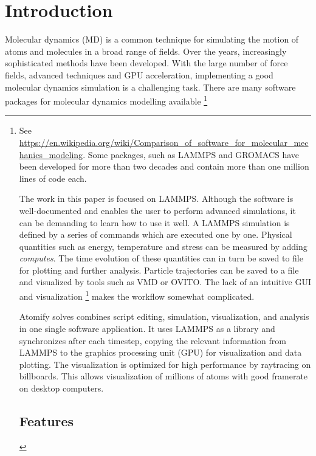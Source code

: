 \documentclass[aps,pre,twocolumn,letterpaper,floatfix]{revtex4}
\begin{document}
\section{Introduction}
%
Molecular dynamics (MD) is a common technique for simulating the motion of atoms
and molecules in a broad range of fields.
Over the years, increasingly sophisticated methods have been developed.
With the large number of force fields, advanced techniques and GPU acceleration,
implementing a good molecular dynamics simulation is a challenging task.
There are many software packages for molecular dynamics modelling
available
\footnote{See \url{https://en.wikipedia.org/wiki/Comparison_of_software_for_molecular_mechanics_modeling}.
Some packages, such as LAMMPS\cite{plimpton1995fast} and GROMACS\cite{Pronk2013}
have been developed for more than two decades and contain more than one million
lines of code each.

The work in this paper is focused on LAMMPS.
Although the software is well-documented and enables the user to perform
advanced simulations, it can be demanding to learn how to use it well.
A LAMMPS simulation is defined by a series of commands which are executed one by
one.
Physical quantities such as energy, temperature and stress can be measured by
adding \textit{computes}.
The time evolution of these quantities can in turn be saved to file for plotting
and further analysis.
Particle trajectories can be saved to a file and visualized by tools such as
VMD\cite{Humphrey1996Vmd} or OVITO\cite{Stukowski2009Visualization}.
The lack of an intuitive GUI and visualization \footnote{which are listed in the
non-features list on the web page:
\url{http://lammps.sandia.gov/non_features.html}} makes the workflow somewhat
complicated.

Atomify solves combines script editing, simulation,
visualization, and analysis in one single software application.
It uses LAMMPS as a library and synchronizes after each timestep,
copying the relevant information from LAMMPS to the graphics processing unit
(GPU) for visualization and data plotting.
The visualization is optimized for high performance by raytracing on billboards.
This allows visualization of millions of atoms with good framerate on desktop
computers.

\section{Features}

}
\end{document}

